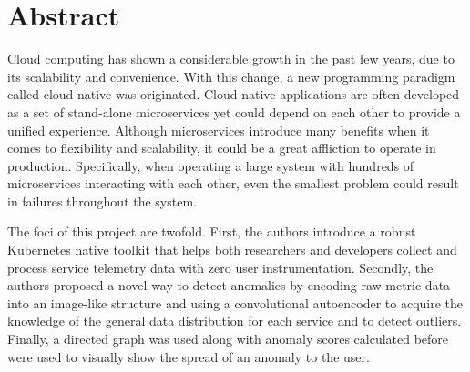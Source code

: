 \chapter*{Abstract}

Cloud computing has shown a considerable growth in the past few years, due to its scalability and convenience. With this change, a new programming paradigm called cloud-native was originated. Cloud-native applications are often developed as a set of stand-alone microservices yet could depend on each other to provide a unified experience. Although microservices introduce many benefits when it comes to flexibility and scalability, it could be a great affliction to operate in production. Specifically, when operating a large system with hundreds of microservices interacting with each other, even the smallest problem could result in failures throughout the system.



The foci of this project are twofold. First, the authors introduce a robust Kubernetes native toolkit that helps both researchers and developers collect and process service telemetry data with zero user instrumentation. Secondly, the authors proposed a novel way to detect anomalies by encoding raw metric data into an image-like structure and using a convolutional autoencoder to acquire the knowledge of the general data distribution for each service and to detect outliers. Finally, a directed graph was used along with anomaly scores calculated before were used to visually show the spread of an anomaly to the user. 

